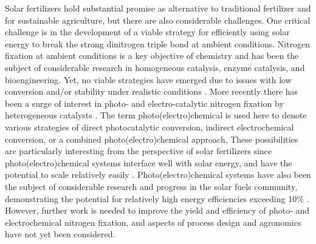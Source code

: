 Solar fertilizers hold substantial promise as alternative to traditional fertilizer and for sustainable agriculture, but there are also considerable challenges. One critical challenge is in the development of a viable strategy for efficiently using solar energy to break the strong dinitrogen triple bond at ambient conditions. Nitrogen fixation at ambient conditions is a key objective of chemistry and has been the subject of considerable research in homogeneous catalysis, enzyme catalysis, and bioengineering. Yet, no viable strategies have emerged due to issues with low conversion and/or stability under realistic conditions \cite{Vicente_2017,Bur_n_2017,MacLeod_2013,Foster2018}.
More recently there has been a surge of interest in photo- and electro-catalytic nitrogen fixation by heterogeneous catalysts \cite{Jewess_2016, Medford_2017,Kyriakou_2017,Foster_2018,Chen_2018,Tao_2019,Song_2019,Luo_2018,Wang_2018}. The term photo(electro)chemical is used here to denote various strategies of direct photocatalytic conversion, indirect electrochemical conversion, or a combined photo(electro)chemical approach. These possibilities are particularly interesting from the perspective of solar fertilizers since photo(electro)chemical systems interface well with solar energy, and have the potential to scale relatively easily \cite{Jewess_2016}. Photo(electro)chemical systems have also been the subject of considerable research and progress in the solar fuels community, demonstrating the potential for relatively high energy efficiencies exceeding 10\% \cite{walter_2010, Pinaud_2013,Kondratenko2013,Shaner_2016, Lewis_2016, Montoya_2017}. However, further work is needed to improve the yield and efficiency of photo- and electrochemical nitrogen fixation, and aspects of process design and agronomics have not yet been considered. %

